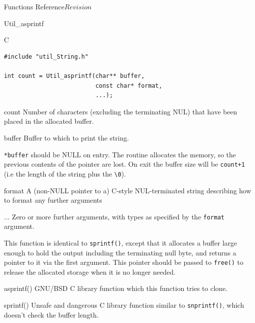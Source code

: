 \begin{cactuspart}{ Functions Reference}{}{$Revision$}
\begin{FunctionDescription}{Util\_asprintf}
\begin{SynopsisSection}
\begin{Synopsis}{C}
\begin{verbatim}
#include "util_String.h"

int count = Util_asprintf(char** buffer,
                          const char* format,
                          ...);
\end{verbatim}
\end{Synopsis}
\end{SynopsisSection}

\begin{ResultSection}
\begin{Result}{count}
Number of characters (excluding the terminating NUL) that have been placed in
the allocated buffer.
\end{Result}
\end{ResultSection}

\begin{ParameterSection}
\begin{Parameter}{buffer}
Buffer to which to print the string.

\verb|*buffer| should be NULL on entry.  The routine
allocates the memory, so the previous contents of
the pointer are lost.
On exit the buffer size will be \verb|count+1| (i.e
the length of the string plus the \verb|\0|).
\end{Parameter}
\begin{Parameter}{format}
A (non-NULL pointer to a) C-style NUL-terminated string describing
how to format any further arguments
\end{Parameter}
\begin{Parameter}{...}
Zero or more further arguments, with types as specified by the
\verb|format| argument.
\end{Parameter}
\end{ParameterSection}

\begin{Discussion}
This function is identical to \verb|sprintf()|, except that it allocates a
buffer large enough to hold the output including the terminating null byte,
and returns a pointer to it via the first argument. This pointer should be
passed to \verb|free()| to release the allocated storage when it is no longer
needed.
\end{Discussion}

\begin{SeeAlsoSection}
\begin{SeeAlso}{asprintf()}
GNU/BSD C library function which this function tries to clone.
\end{SeeAlso}
\begin{SeeAlso}{sprintf()}
Unsafe and dangerous C library function similar to \verb|snprintf()|,
which doesn't check the buffer length.
\end{SeeAlso}
\end{SeeAlsoSection}
\end{FunctionDescription}


\end{cactuspart}
